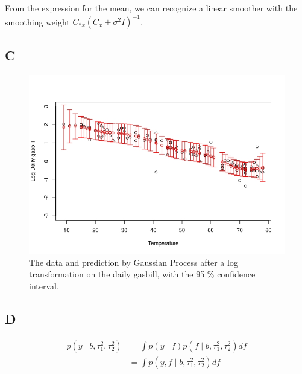 \documentclass{article}
\begin{document}
From the expression for the mean, we can recognize a linear smoother with the smoothing weight \( C_{*x} (C_x + \sigma^2 I)^{-1} \).

\subsection*{C}
\begin{figure}
\includegraphics[width=\textwidth]{util_gp_ci.jpeg}
\caption{The data and prediction by Gaussian Process after a log transformation on the daily gasbill, with the 95 \% confidence interval.}
\label{fig:util_log}
\end{figure}


\subsection*{D}
\begin{align*}
p(y \mid b, \tau_1^2, \tau_2^2) &= \int p(y \mid f) p( f \mid b, \tau_1^2, \tau_2^2) df\\
&= \int p(y, f \mid b, \tau_1^2, \tau_2^2) df
\end{align*}
\end{document}
